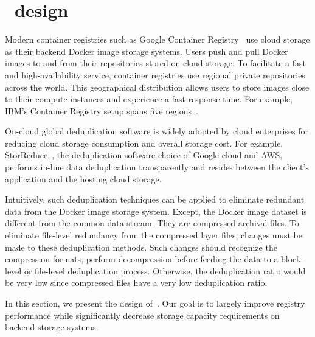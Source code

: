 \section{\sysname~design}
\label{sec:slimmer}

%



Modern container registries such as Google Container Registry~\cite{GoogleContainerRegistry} use cloud storage as their backend Docker image storage systems. 
Users push and pull Docker images to and from their repositories stored on cloud storage. 
To facilitate a fast and high-availability service, container registries use regional private repositories across the world.  
This geographical distribution allows users to store images close to their compute instances and experience a fast response time. 
For example, IBM's Container Registry setup spans five regions~\cite{dockerworkload}. 

On-cloud global deduplication software is widely adopted by cloud enterprises for reducing cloud storage consumption and overall storage cost. 
For example, StorReduce~\cite{storreduce_purestorage}, the deduplication software choice of Google cloud and AWS, 
performs in-line data deduplication transparently and resides between the client's application and the hosting cloud storage.

Intuitively, such deduplication techniques can be applied to eliminate redundant data from the Docker image storage system.  
Except, the Docker image dataset is different from the common data stream. 
They are compressed archival files.
To eliminate file-level redundancy from the compressed layer files, changes must be made to these deduplication methods. 
Such changes should recognize the compression formats, perform decompression before feeding the data to a block-level or file-level deduplication process. 
Otherwise, the deduplication ratio would be very low since compressed files have a very low deduplication ratio. 

In this section, we present the design of~\sysname.
Our goal is to largely improve registry performance while significantly decrease storage capacity requirements on backend storage systems.










